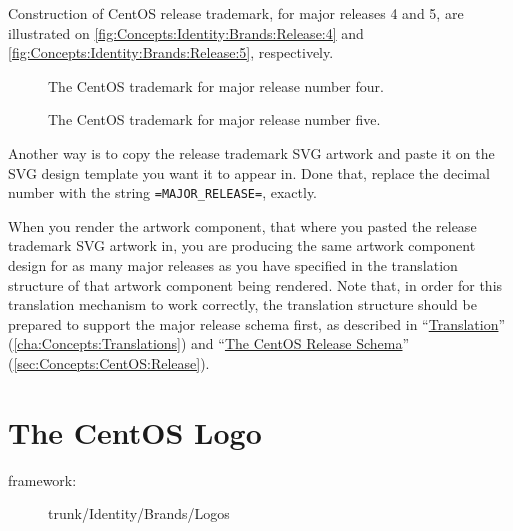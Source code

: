 Construction of CentOS release trademark, for major releases 4 and 5,
are illustrated on \autoref{fig:Concepts:Identity:Brands:Release:4}
and \autoref{fig:Concepts:Identity:Brands:Release:5}, respectively.

\begin{figure}
\begin{center}
\end{center}
\caption{The CentOS trademark for major release number four.%
    \label{fig:Concepts:Identity:Brands:Release:4}}
\end{figure}

\begin{figure}
\begin{center}
\end{center}
\caption{The CentOS trademark for major release number five.%
    \label{fig:Concepts:Identity:Brands:Release:5}}
\end{figure}

Another way is to copy the release trademark SVG artwork and paste it
on the SVG design template you want it to appear in. Done that,
replace the decimal number with the string \texttt{=MAJOR\_RELEASE=},
exactly.

When you render the artwork component, that where you pasted the
release trademark SVG artwork in, you are producing the same artwork
component design for as many major releases as you have specified in
the translation structure of that artwork component being rendered.
Note that, in order for this translation mechanism to work correctly,
the translation structure should be prepared to support the major
release schema first, as described in
``\hyperlink{cha:Concepts:Translations}{Translation}''
(\autoref{cha:Concepts:Translations}) and
``\hyperlink{sec:Concepts:CentOS:Release}{The CentOS Release Schema}''
(\autoref{sec:Concepts:CentOS:Release}).

\section{The CentOS Logo}
\hypertarget{sec:Concepts:Identity:Brands:Logos}{}
\label{sec:Concepts:Identity:Brands:Logos}

\begin{description}
\item[framework:] trunk/Identity/Brands/Logos
\end{description}

